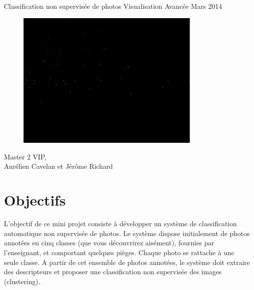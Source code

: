 \documentclass[12pt,a4paper,utf8x]{report}
\begin{document}
\begin{titlepage}
\hfill
  \begin{center}
    \begin{minipage}[t]{12cm} 
    \huge \center Classification non supervisée de photos
    \huge \center Visualisation Avancée
    \huge \center Mars 2014
    \end{minipage}
  \end{center}
\vfill
\begin{figure}[!h]
      \centering            
      \includegraphics[width=0.8\textwidth]{ACP_SIFT.png} 
    \end{figure}
\begin{flushleft}
\begin{minipage}[t]{5cm}
Master 2 VIP, \\ Aurélien Cavelan et Jérôme Richard
\end{minipage}
\end{flushleft}

\end{titlepage}
\tableofcontents

\chapter{Objectifs}

L'objectif de ce mini projet consiste à développer un système de classification automatique non supervisée de photos. Le système dispose initialement de photos annotées en cinq classes (que vous découvrirez aisément), fournies par l'enseignant, et comportant quelques pièges. Chaque photo se rattache à une seule classe. A partir de cet ensemble de photos annotées, le système doit extraire des descripteurs et proposer une classification non supervisée des images (clustering).
\end{document}
